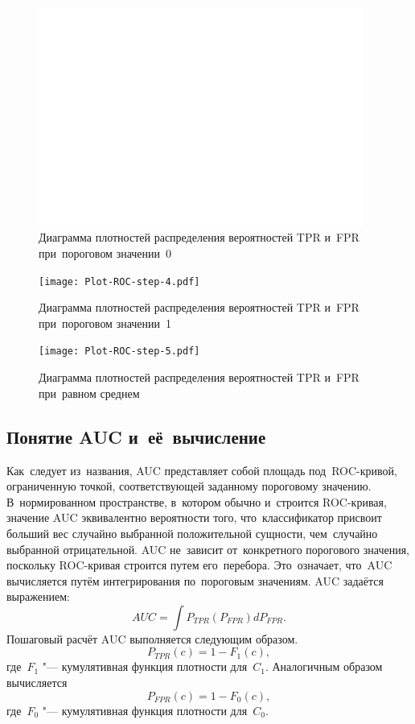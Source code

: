 \documentclass[]{scrreprt}
\begin{document}
\clearpage
%
\begin{figure}[ht]
	\centering
	\includegraphics[width=0.95\textwidth]{Plot-ROC-step-3.pdf}
	\caption{Диаграмма плотностей распределения вероятностей TPR и~FPR при~пороговом значении~0}
	\label{fig:plot-TPR-FPR-prob-density-3}
\end{figure}
%
\begin{figure}[ht]
	\centering
	\texttt{[image: Plot-ROC-step-4.pdf]}
	\caption{Диаграмма плотностей распределения вероятностей TPR и~FPR при~пороговом значении~1}
	\label{fig:plot-TPR-FPR-prob-density-4}
\end{figure}
%
\begin{figure}[ht]
	\centering
	\texttt{[image: Plot-ROC-step-5.pdf]}
	\caption{Диаграмма плотностей распределения вероятностей TPR и~FPR при~равном среднем}
	\label{fig:plot-TPR-FPR-prob-density-5}
\end{figure}
%
\subsection{Понятие AUC и~её~вычисление}
Как~следует из~названия, AUC представляет собой площадь под~ROC-кривой, ограниченную точкой, соответствующей заданному пороговому значению. В~нормированном пространстве, в~котором обычно и~строится ROC-кривая, значение AUC эквивалентно вероятности того, что~классификатор присвоит больший вес случайно выбранной положительной сущности, чем~случайно выбранной отрицательной. AUC не~зависит от~конкретного порогового значения, поскольку ROC-кривая строится путем его~перебора. Это~означает, что~AUC вычисляется путём интегрирования по~пороговым значениям. AUC задаётся выражением:
\begin{equation}\label{eq:AUC-computation-0}
AUC = \int P_{TPR}(P_{FPR}) d P_{FPR}.
\end{equation}
Пошаговый расчёт AUC выполняется следующим образом.
\begin{equation}\label{eq:AUC-computation-1}
P_{TPR}(c) = 1 - F_{1}(c),
\end{equation}
где~$F_{1}$ "--- кумулятивная функция плотности для~$C_{1}$. Аналогичным образом вычисляется
\begin{equation}\label{eq:AUC-computation-2}
P_{FPR}(c) = 1 - F_{0}(c),
\end{equation}
где~$F_{0}$ "--- кумулятивная функция плотности для~$C_{0}$.
\end{document}
